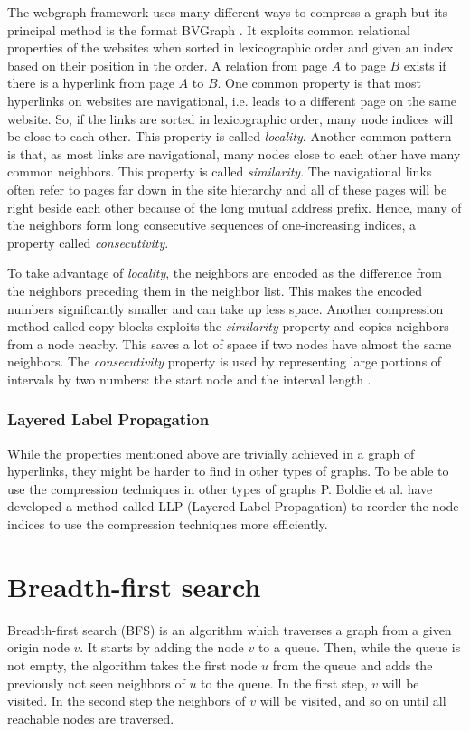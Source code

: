 The webgraph framework \cite{webgraph} uses many different ways to compress a graph but its principal method is the format BVGraph \cite{webgraph-compression}. It exploits common relational properties of the websites when sorted in lexicographic order and given an index based on their position in the order. A relation from page $A$ to page $B$ exists if there is a hyperlink from page $A$ to $B$. One common property is that most hyperlinks on websites are navigational, i.e. leads to a different page on the same website. So, if the links are sorted in lexicographic order, many node indices will be close to each other. This property is called \emph{locality}. Another common pattern is that, as most links are navigational, many nodes close to each other have many common neighbors. This property is called \emph{similarity}. The navigational links often refer to pages far down in the site hierarchy and all of these pages will be right beside each other because of the long mutual address prefix. Hence, many of the neighbors form long consecutive sequences of one-increasing indices, a property called \emph{consecutivity}.

To take advantage of \emph{locality}, the neighbors are encoded as the difference from the neighbors preceding them in the neighbor list. This makes the encoded numbers significantly smaller and can take up less space. Another compression method called copy-blocks exploits the \emph{similarity} property and copies neighbors from a node nearby. This saves a lot of space if two nodes have almost the same neighbors. The \emph{consecutivity} property is used by representing large portions of intervals by two numbers: the start node and the interval length \cite{webgraph-compression}. 


\subsubsection{Layered Label Propagation}

While the properties mentioned above are trivially achieved in a graph of hyperlinks, they might be harder to find in other types of graphs. To be able to use the compression techniques in other types of graphs P. Boldie et al. have developed a method called LLP (Layered Label Propagation) \cite{llp} to reorder the node indices to use the compression techniques more efficiently. 

\section{Breadth-first search}
Breadth-first search (BFS) is an algorithm which traverses a graph from a given origin node $v$. It starts by adding the node $v$ to a queue. Then, while the queue is not empty, the algorithm takes the first node $u$ from the queue and adds the previously not seen neighbors of $u$ to the queue. In the first step, $v$ will be visited. In the second step the neighbors of $v$ will be visited, and so on until all reachable nodes are traversed.

